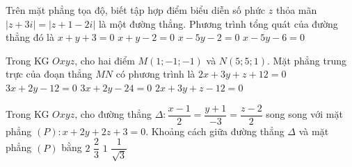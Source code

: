 \begin{ex}%
	Trên mặt phẳng tọa độ, biết tập hợp điểm biểu diễn số phức $z$ thỏa mãn $\left|z+3i\right|=\left| z+1-2i\right|$ là một đường thẳng. Phương trình tổng quát của đường thẳng đó là
	\choice
	{$x+y+3=0$}
	{$x+y-2=0$}
	{\True $x-5y-2=0$}
	{$x-5y-6=0$}
\end{ex}

\begin{ex}%
	Trong KG $Oxyz$, cho hai điểm $M\left(1;-1;-1\right)$ và $N\left(5;5;1\right)$. Mặt phẳng trung trực của đoạn thẳng $MN$ có phương trình là
	\choice
	{$2x+3y+z+12=0$}
	{$3x+2y-12=0$}
	{$3x+2y-24=0$}
	{\True $2x+3y+z-12=0$}
\end{ex}

\begin{ex}%
	Trong KG $Oxyz$, cho đường thẳng $\Delta \colon \dfrac{x-1}{2}=\dfrac{y+1}{-3}=\dfrac{z-2}{2}$ song song với mặt phẳng $(P)\colon x+2y+2z+3=0$. Khoảng cách giữa đường thẳng $\Delta$ và mặt phẳng $(P)$ bằng
	\choice
	{\True $2$}
	{$\dfrac{2}{3}$}
	{$1$}
	{$\dfrac{1}{\sqrt{3}}$}
\end{ex}

